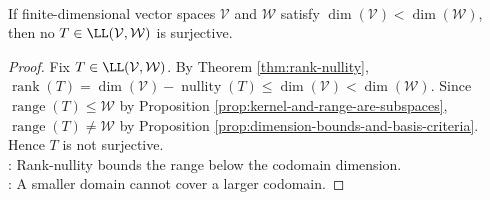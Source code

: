 \begin{corollary} \label{cor:map-to-larger-space-not-surjective} \\
If finite-dimensional vector spaces $\mathcal{V}$ and $\mathcal{W}$ satisfy $\dim(\mathcal{V})<\dim(\mathcal{W})$, then no $T\in\LL(\mathcal{V},\mathcal{W})$ is surjective.
\begin{proof}
Fix $T\in\LL(\mathcal{V},\mathcal{W})$. By Theorem \ref{thm:rank-nullity}, $\operatorname{rank}(T)=\dim(\mathcal{V})-\operatorname{nullity}(T)\leq\dim(\mathcal{V})<\dim(\mathcal{W})$. Since $\operatorname{range}(T)\leq\mathcal{W}$ by Proposition \ref{prop:kernel-and-range-are-subspaces}, $\operatorname{range}(T)\neq\mathcal{W}$ by Proposition \ref{prop:dimension-bounds-and-basis-criteria}. Hence $T$ is not surjective.\\
: Rank-nullity bounds the range below the codomain dimension.\\
: A smaller domain cannot cover a larger codomain.
\end{proof}
\end{corollary}


